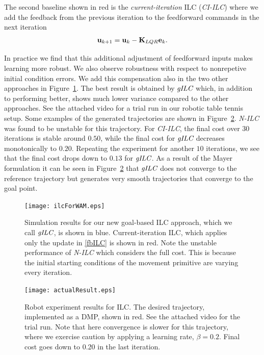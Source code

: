 The second baseline shown in red is the \emph{current-iteration} ILC (\emph{CI-ILC}) where we add the feedback from the previous iteration to the feedforward commands in the next iteration
%
\begin{equation}
\begin{aligned}
\boldsymbol{\mathrm{u}}_{k+1} &= \boldsymbol{\mathrm{u}}_k - \boldsymbol{\mathrm{K}}_{LQR}\boldsymbol{\mathrm{e}}_{k}.\\
\end{aligned}
\label{fbILC}
\end{equation}
%

\noindent In practice we find that this additional adjustment of feedforward inputs makes learning more robust. We also observe robustness with respect to nonrepetive initial condition errors. We add this compensation also in the two other approaches in Figure~\ref{ILCTrajectoryTT}. The best result is obtained by $\emph{gILC}$ which, in addition to performing better, shows much lower variance compared to the other approaches. See the attached video for a trial run in our robotic table tennis setup. Some examples of the generated trajectories are shown in Figure~\ref{actualResultWAM}. \emph{N-ILC} was found to be unstable for this trajectory. For \emph{CI-ILC}, the final cost over $30$ iterations is stable around $0.50$, while the final cost for $\emph{gILC}$ decreases monotonically to $0.20$. Repeating the experiment for another $10$ iterations, we see that the final cost drops down to $0.13$ for $\emph{gILC}$. As a result of the Mayer formulation it can be seen in Figure~\ref{actualResultWAM} that $\emph{gILC}$ does not converge to the reference trajectory but generates very smooth trajectories that converge to the goal point.


\begin{figure}
\center
\texttt{[image: ilcForWAM.eps]}
\caption{Simulation results for our new goal-based ILC approach, which we call $\emph{gILC}$, is shown in blue. Current-iteration ILC, which applies only the update in \eqref{fbILC} is shown in red. Note the unstable performance of \emph{N-ILC} which considers the full cost. This is because the initial starting conditions of the movement primitive are varying every iteration.}
\label{ILCTrajectoryTT}
\end{figure}

\begin{figure}
\center
\texttt{[image: actualResult.eps]}
\caption{Robot experiment results for ILC. The desired trajectory, implemented as a DMP, shown in red. See the attached video for the trial run. Note that here convergence is slower for this trajectory, where we exercise caution by applying a learning rate, $\beta = 0.2$. Final cost goes down to 0.20 in the last iteration.}
\label{actualResultWAM}
\end{figure}